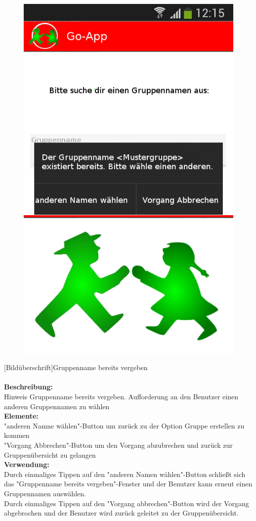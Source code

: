 \begin{figure}
	\includegraphics[scale =1]{resources/images/gruppe_erstellen_ungueltig.png}
\end{figure}
[Bildüberschrift]Gruppenname bereits vergeben\\ \\
\textbf{Beschreibung:}\\
Hinweis Gruppenname bereits vergeben. Aufforderung an den Benutzer einen anderen Gruppennamen zu wählen\\
\textbf{Elemente:}\\
"anderen Namne wählen"-Button um zurück zu der Option Gruppe erstellen zu kommen\\
"Vorgang Abbrechen"-Button um den Vorgang abzubrechen und zurück zur Gruppenübersicht zu gelangen\\
\textbf{Verwendung:}\\
Durch einmaliges Tippen auf den "anderen Namen wählen"-Button schließt sich das "Gruppenname bereits vergeben"-Fenster und der Benutzer kann erneut einen Gruppennamen auswählen.\\
Durch einmaliges Tippen auf den "Vorgang abbrechen"-Button wird der Vorgang abgebrochen und der Benutzer wird zurück geleitet zu der Gruppenübersicht.\\ \\

